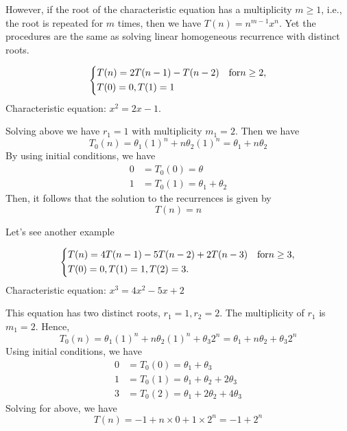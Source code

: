 However, if the root of the characteristic equation has a multiplicity \(m \geq 1\), i.e., the root is repeated for \(m\)  times, then we have \(T(n) = n^{m-1}x^n\). Yet the procedures are the same as solving linear homogeneous recurrence with distinct roots. 

\begin{eg}
    \[
        \begin{dcases}
            T(n) = 2T(n - 1) - T(n - 2)\quad\text{for} n \geq 2,\\
            T(0) = 0, T(1) = 1\\
        \end{dcases}
    \]
    Characteristic equation: \(x^2 = 2x - 1\). 

    Solving above we have \(r_1 = 1\) with multiplicity \(m_1 = 2\).
    Then we have
    \[
        T_0(n) = \theta_1 (1)^n + n\theta_2(1)^n = \theta_1+ n\theta_2
    \]
    By using initial conditions, we have
    \[
        \begin{aligned}
            0 &= T_0(0) = \theta \\
            1 &= T_0(1) = \theta_1 + \theta_2
        \end{aligned}
    \]
    Then, it follows that the solution to the recurrences is given by
    \[
        T(n) = n
    \]
\end{eg}

Let's see another example
\begin{eg}
\[
    \begin{dcases}
        T(n) = 4T(n-1) - 5T(n-2) + 2T(n-3)\quad\text{for} n\geq 3,\\
        T(0) = 0, T(1) = 1, T(2) = 3.
    \end{dcases}
\]
Characteristic equation: \(x^3 = 4x^2 - 5x + 2\) 

This equation has two distinct roots, \(r_1 = 1, r_2 = 2\). The multiplicity of \(r_1\) is \(m_1 = 2\). Hence,
\[
    T_0(n) = \theta_1 (1)^n + n\theta_2 (1)^n + \theta_3 2^n = \theta_1 + n\theta_2 + \theta_3 2^n
\]
Using initial conditions, we have
\[
    \begin{aligned}
        0 &= T_0(0) = \theta_1 + \theta_3 \\
        1 &= T_0(1) = \theta_1 + \theta_2 + 2\theta_3 \\
        3 &= T_0(2) = \theta_1 + 2\theta_2 + 4\theta_3
    \end{aligned}
\]
Solving for above, we have
\[
    T(n) = -1 + n\times0 + 1 \times 2^n = -1 + 2^n
\]
\end{eg}

